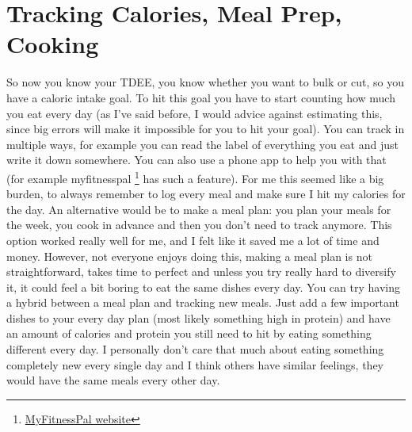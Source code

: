 \documentclass[openany, 12pt]{book}
\begin{document}
        \section{Tracking Calories, Meal Prep, Cooking}

        So now you know your TDEE, you know whether you want to bulk or cut, so you have a caloric intake goal. To hit this goal you have to start counting how much you eat
        every day (as I've said before, I would advice against estimating this, since big errors will make it impossible for you to hit your goal). You can track in multiple
        ways, for example you can read the label of everything you eat and just write it down somewhere. You can also use a phone app to help you with that (for example myfitnesspal
        \footnote{\href{https://www.myfitnesspal.com/}{MyFitnessPal website}} has such a feature). For me this seemed like a big burden, to always remember to log
        every meal and make sure I hit my calories for the day. An alternative would be to make a meal plan: you plan your meals for the week, you cook in advance and then you
        don't need to track anymore. This option worked really well for me, and I felt like it saved me a lot of time and money. However, not everyone enjoys doing this, making a meal
        plan is not straightforward, takes time to perfect and unless you try really hard to diversify it, it could feel a bit boring to eat the same dishes every day. You can
        try having a hybrid between a meal plan and tracking new meals. Just add a few important dishes to your every day plan (most likely something high in protein) and
        have an amount of calories and protein you still need to hit by eating something different every day. I personally don't care that much about eating something completely
        new every single day and I think others have similar feelings, they would have the same meals every other day.
\end{document}
